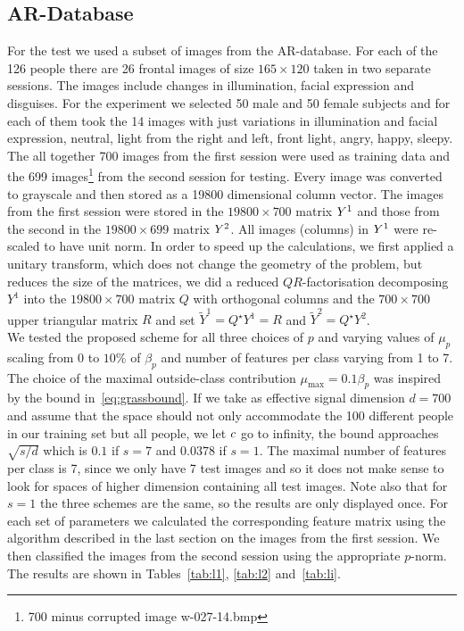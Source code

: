 \documentclass[11pt]{article}
\begin{document}
\subsection{AR-Database}
For the test we used a subset of images from the AR-database. For each of the 126 people there are 26 frontal images of size $165\times120$ taken in two separate sessions. The images include changes in illumination, facial expression and disguises. For the experiment we selected 50 male and 50 female subjects and for each of them took the 14 images with just variations in illumination and facial expression, neutral, light from the right and left, front light, angry, happy, sleepy. The all together 700 images from the first session were used as training data and the 699 images\footnote{700 minus corrupted image w-027-14.bmp} from the second session for testing. Every image was converted to grayscale and then stored as a 19800 dimensional column vector. The images from the first session were stored in the $19800\times 700$ matrix ${Y}^1$ and those from the second in the $19800\times699$ matrix ${Y}^2$. All images (columns) in ${Y}^1$ were re-scaled to have unit norm. In order to speed up the calculations, we first applied a unitary transform, which does not change the geometry of the problem, but reduces the size of the matrices, \ie we did a reduced $QR$-factorisation decomposing $Y^1$ into the $19800\times700$ matrix $Q$ with orthogonal columns and the $700\times700$ upper triangular matrix $R$ and set $\tilde{Y}^1=Q^\star Y^1=R$ and $\tilde{Y}^2=Q^\star Y^2$. \\
We tested the proposed scheme for all three choices of $p$ and varying values of $\mu_p$ scaling from $0$ to $10\%$ of $\beta_p$ and number of features per class varying from 1 to 7. The choice of the maximal outside-class contribution $\mu_{\max}=0.1\beta_p$ was inspired by the bound in~\eqref{eq:grassbound}. If we take as effective signal dimension $d=700$ and assume that the space should not only accommodate the 100 different people in our training set but all people, \ie we let ${c}$ go to infinity, the bound approaches $\sqrt{s/d}$ which is $0.1$ if $s=7$ and $0.0378$ if $s=1$. The maximal number of features per class is 7, since we only have 7 test images and so it does not make sense to look for spaces of higher dimension containing all test images. Note also that for $s=1$ the three schemes are the same, so the results are only displayed once. For each set of parameters we calculated the corresponding feature matrix using the algorithm described in the last section on the images from the first session. We then classified the images from the second session using the appropriate $p$-norm. The results are shown in Tables~\ref{tab:l1}, \ref{tab:l2} and~\ref{tab:li}.
\end{document}
